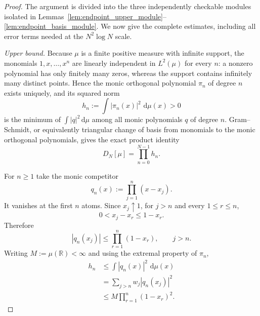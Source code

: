 \documentclass[preprint,12pt]{elsarticle}
\numberwithin{equation}{section}
\theoremstyle{plain}
\theoremstyle{definition}
\theoremstyle{remark}
\newcommand{\dd}{\,\mathrm d}
\begin{document}
\begin{proof}
The argument is divided into the three independently checkable modules isolated in
Lemmas~\ref{lem:endpoint_upper_module}--\ref{lem:endpoint_basis_module}.  We now give the
complete estimates, including all error terms needed at the \(N^2\log N\) scale.

\emph{Upper bound.}
Because $\mu$ is a finite positive measure with infinite support, the monomials $1,x,\ldots,x^n$ are linearly independent in $L^2(\mu)$ for every $n$: a nonzero polynomial has only finitely many zeros, whereas the support contains infinitely many distinct points.  Hence the monic orthogonal polynomial $\pi_n$ of degree $n$ exists uniquely, and its squared norm
\begin{equation}
h_n:=\int |\pi_n(x)|^2\,\dd\mu(x)>0
\end{equation}
is the minimum of $\int|q|^2\dd\mu$ among all monic polynomials $q$ of degree $n$.  Gram--Schmidt, or equivalently triangular change of basis from monomials to the monic orthogonal polynomials, gives the exact product identity
\begin{equation}
D_N[\mu]=\prod_{n=0}^{N-1}h_n.
\label{eq:abstract_D_product_h}
\end{equation}

For $n\ge1$ take the monic competitor
\begin{equation}
q_n(x):=\prod_{j=1}^{n}(x-x_j).
\end{equation}
It vanishes at the first $n$ atoms.  Since $x_j\uparrow1$, for $j>n$ and every $1\le r\le n$,
\begin{equation}
0<x_j-x_r\le1-x_r.
\end{equation}
Therefore
\begin{equation}
|q_n(x_j)|\le\prod_{r=1}^{n}(1-x_r),\qquad j>n.
\end{equation}
Writing $M:=\mu(\mathbb R)<\infty$ and using the extremal property of $\pi_n$,
\begin{align}
h_n
&\le\int |q_n(x)|^2\,\dd\mu(x)\\
&=\sum_{j>n}w_j|q_n(x_j)|^2\\
&\le M\prod_{r=1}^{n}(1-x_r)^2.
\label{eq:abstract_monic_upper}
\end{align}


\end{proof}
\end{document}
